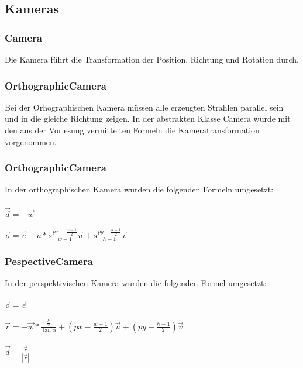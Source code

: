 \documentclass[14pt]{extarticle}
\begin{document}
\subsection{Kameras}
\subsubsection{Camera}
Die Kamera führt die Transformation der Position, Richtung und Rotation durch.
\subsubsection{OrthographicCamera}
Bei der Orhographischen Kamera müssen alle erzeugten Strahlen parallel sein und in die gleiche Richtung zeigen.
In der abstrakten Klasse Camera wurde mit den aus der Vorlesung vermittelten Formeln die  Kameratransformation vorgenommen.

\subsubsection{OrthographicCamera}
In der orthographischen Kamera wurden die folgenden Formeln umgesetzt:\\\\
\begin{math}\vec{d}=-\vec{w}\end{math}\\\\
\begin{math}\vec{o}=\vec{e}+a*s\frac{px-\frac{w-1}{2}}{w-1}\vec{u}+s\frac{py-\frac{h-1}{2}}{h-1}\vec{v}\end{math}

\subsubsection{PespectiveCamera}  
In der perspektivischen Kamera wurden die folgenden Formel umgesetzt:\\\\
\begin{math}\vec{o}=\vec{e}\end{math}\\\\
\begin{math}\vec{r}=-\vec{w}*\frac{\frac{h}{2}}{\tan\alpha}+(px-\frac{w-1}{2})\vec{u}+(py-\frac{h-1}{2})\vec{v}\end{math}\\\\
\begin{math}\vec{d}=\frac{\vec{r}}{|\vec{r}|}\end{math}\\\\
\end{document}
